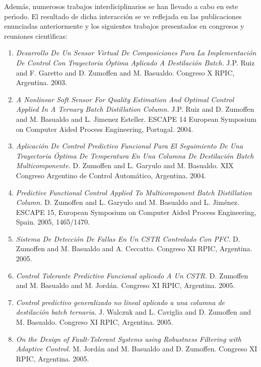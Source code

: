 Adem{\'a}s, numerosos trabajos interdiciplinarios se han llevado a cabo en este per{\'\i}odo. El resultado de dicha
interacci{\'o}n se ve reflejada en las publicaciones enunciadas anteriormente y los siguientes trabajos
presentados en congresos y reuniones cient{\'\i}ficas:
\begin{enumerate}
\small
\item \textit{Desarrollo De Un Sensor Virtual De Composiciones Para La Implementaci{\'o}n De Control
 Con Trayectoria {\'O}ptima Aplicado A Destilaci{\'o}n Batch.} J.P. Ruiz and F. Garetto  and D. Zumoffen and M.
 Basualdo. Congreso X RPIC, Argentina. 2003.

\item \textit{A Nonlinear Soft Sensor For Quality Estimation And Optimal Control Applied In A Ternary Batch
Distillation Column.} J.P. Ruiz and D. Zumoffen and M. Basualdo and L. Jimenez  Esteller. ESCAPE 14
European Symposium on Computer Aided Process Engineering, Portugal. 2004.

\item \textit{Aplicaci{\'o}n De Control Predictivo Funcional Para El Seguimiento De Una Trayectoria {\'O}ptima De
Temperatura En Una Columna De Destilaci{\'o}n Batch Multicomponente.} D. Zumoffen and L. Garyulo and M.
Basualdo. XIX  Congreso Argentino de Control Autom{\'a}tico, Argentina. 2004.

\item \textit{Predictive Functional Control Applied To Multicomponent Batch Distillation Column.} D.
Zumoffen and L. Garyulo and M. Basualdo and L. Jim{\'e}nez. ESCAPE 15, European Symposium on Computer Aided
Process Engineering, Spain. 2005, 1465/1470.

\item \textit{Sistema De Detecci{\'o}n De Fallas En Un CSTR Controlado Con PFC.} D. Zumoffen and M. Basualdo
and A. Ceccatto. Congreso XI RPIC, Argentina. 2005.

\item \textit{Control Tolerante Predictivo Funcional aplicado A Un CSTR.} D. Zumoffen and M. Basualdo and
M. Jord{\'a}n. Congreso XI RPIC, Argentina. 2005.

\item \textit{Control predictivo generalizado no lineal aplicado a una columna de destilaci{\'o}n batch
ternaria.} J. Walczuk and L. Caviglia and D. Zumoffen and M. Basualdo. Congreso XI RPIC, Argentina. 2005.

\item \textit{On the Design of Fault-Tolerant Systems using Robustness Filtering with Adaptive Control.} M.
Jord{\'a}n and M. Basualdo and D. Zumoffen. Congreso XI RPIC, Argentina. 2005.


\end{enumerate}
